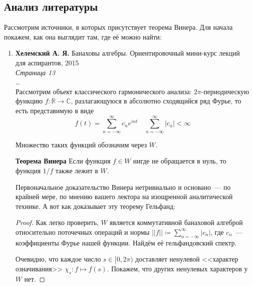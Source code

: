 \documentclass[12pt]{extarticle}
\theoremstyle{definition}
\begin{document}
    \subsection{Анализ литературы}
    Рассмотрим источники, в которых присутствует теорема Винера. Для начала покажем, как она выглядит там, где её можно найти:
    	\begin{enumerate}
			\item \textbf{Хелемский А. Я.} Банаховы алгебры. Ориентировочный мини-курс лекций для аспирантов, 2015\\
			\textit{Страница 13}\\
			\dots\\
			Рассмотрим объект классического гармонического анализа: $2\pi$-периодическую функцию $f\colon \mathbb{R}\rightarrow\mathbb{C}$, разлагающуюся в абсолютно сходящийся ряд Фурье, то есть представимую в виде
            $$f(t)=\sum_{n=-\infty}^\infty c_n e^{int}\quad \sum_{n=-\infty}^\infty |c_n|<\infty$$

            Множество таких функций обозначим через $W$.

			\textbf{Теорема Винера}
				Если функция $f\in W$ нигде не обращается в нуль, то функция $1/f$ также лежит в $W$.

				Первоначальное доказательство Винера нетривиально и основано~--- по крайней мере, по мнению вашего лектора на изощренной аналитической технике. А вот как доказывает эту теорему Гельфанд:
			\begin{proof}
				Как легко проверить, $W$ является коммутативной банаховой алгеброй относительно поточечных операций и нормы $||f||\coloneq\sum_{n=-\infty}^\infty |c_n|$, где $c_n$~--- коэффициенты Фурье нашей функции. Найдём её гельфандовский спектр.

				Очевидно, что каждое число $s\in[0,2\pi)$ доставляет ненулевой <<характер означивания>> $\chi_s\colon f\mapsto f(s)$. Покажем, что других ненулевых характеров у $W$ нет.


\end{proof}
\end{enumerate}
\end{document}
